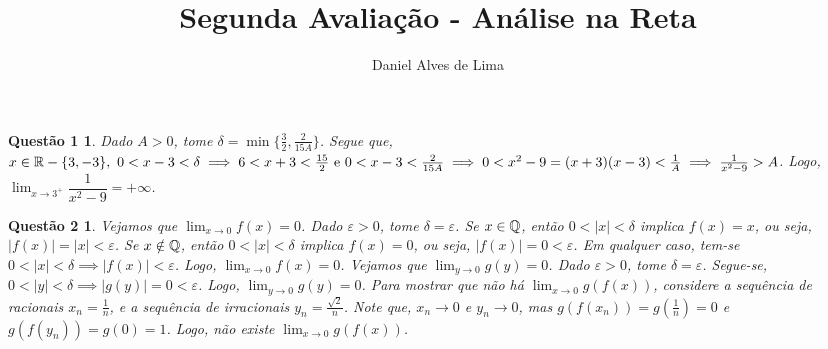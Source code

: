 \documentclass[a4paper,12pt]{article}
\title{\textbf {Segunda Avaliação - Análise na Reta}}
\author[1]{Daniel Alves de Lima}
\date{}
\newtheorem*{1}{Questão 1}
\newtheorem*{2}{Questão 2}
\begin{document}
	
\maketitle

\begin{1}

	Dado $A > 0$, tome $\delta = \min\{\frac32, \frac{2}{15A}\}$. Segue que, $x \in \Bbb R-\{3,-3\}, \ 0 < x-3 < \delta \implies 6 < x + 3 < \frac{15}{2} \ \text{e} \ 0 < x - 3 < \frac{2}{15A} \implies 0 < x^2 - 9 = (x+3)(x-3) < \frac{1}{A} \implies \frac{1}{x^2 - 9} > A$. Logo, $\lim_{x\to 3^+}\dfrac{1}{x^2 - 9} = +\infty$.

\end{1}

\begin{2}

	Vejamos que $\lim_{x\to0}f(x) = 0$. Dado $\varepsilon > 0$, tome $\delta = \varepsilon$. Se $x \in \Bbb Q$, então $0 < |x| < \delta$ implica $f(x) = x$, ou seja, $|f(x)| = |x| < \varepsilon$. Se $x \notin \Bbb Q$, então $0 < |x| < \delta$ implica $f(x) = 0$, ou seja, $|f(x)| = 0 < \varepsilon$. Em qualquer caso, tem-se $0 < |x| < \delta \implies |f(x)| < \varepsilon$. Logo, $\lim_{x\to0}f(x) = 0$. Vejamos que $\lim_{y\to0}g(y) = 0$. Dado $\varepsilon > 0$, tome $\delta = \varepsilon$. Segue-se, $0 < |y| < \delta \implies |g(y)| = 0 < \varepsilon$. Logo, $\lim_{y\to0}g(y) = 0$. Para mostrar que não há $\lim_{x\to0}g(f(x))$, considere a sequência de racionais $x_n = \frac{1}{n}$, e a sequência de irracionais $y_n = \frac{\sqrt2}{n}$. Note que, $x_n \to 0$ e $y_n \to 0$, mas $g(f(x_n)) = g(\frac{1}{n}) = 0$ e $g(f(y_n)) = g(0) = 1$. Logo, não existe $\lim_{x\to0}g(f(x))$.

\end{2}
\end{document}

